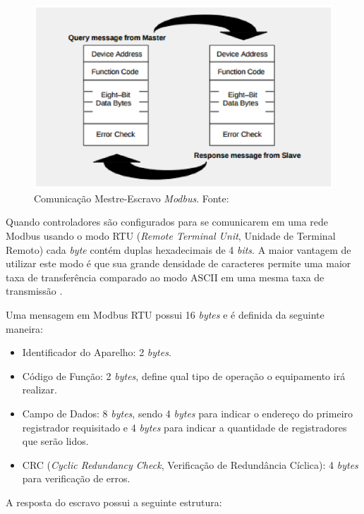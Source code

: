     \begin{figure}[!htpb]
        \centering
        \includegraphics[keepaspectratio=true,scale=0.8]{figuras/mestre_escravo.eps}
        \caption{Comunicação Mestre-Escravo \textit{Modbus}. Fonte: \cite{modbus}}
        \label{mestre_escravo}
    \end{figure}

    Quando controladores são configurados para se comunicarem em uma rede Modbus usando o modo RTU (\textit{Remote Terminal Unit}, Unidade de Terminal Remoto) cada \textit{byte} contém duplas hexadecimais de 4 \textit{bits}. A maior vantagem de utilizar este modo é que sua grande densidade de caracteres permite uma maior taxa de transferência comparado ao modo ASCII em uma mesma taxa de transmissão \cite{modbus}.

    Uma mensagem em Modbus RTU possui 16 \textit{bytes} e é definida da seguinte maneira:
    \begin{itemize}
        \item Identificador do Aparelho: 2 \textit{bytes}.
        \item Código de Função: 2 \textit{bytes}, define qual tipo de operação o equipamento irá realizar.
        \item Campo de Dados: 8 \textit{bytes}, sendo 4 \textit{bytes} para indicar o endereço do primeiro registrador requisitado e 4 \textit{bytes} para indicar a quantidade de registradores que serão lidos.
        \item CRC (\textit{Cyclic Redundancy Check}, Verificação de Redundância Cíclica): 4 \textit{bytes} para verificação de erros.
    \end{itemize}

    A resposta do escravo possui a seguinte estrutura:

